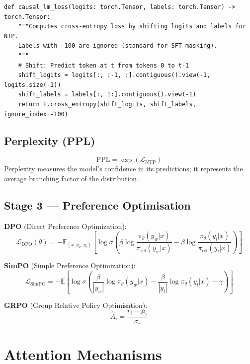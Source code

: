 \begin{lstlisting}[style=pythonstyle, caption={Causal LM loss with token masking}, label=lst:ntp_loss]
def causal_lm_loss(logits: torch.Tensor, labels: torch.Tensor) -> torch.Tensor:
    """Computes cross-entropy loss by shifting logits and labels for NTP.
    Labels with -100 are ignored (standard for SFT masking).
    """
    # Shift: Predict token at t from tokens 0 to t-1
    shift_logits = logits[:, :-1, :].contiguous().view(-1, logits.size(-1))
    shift_labels = labels[:, 1:].contiguous().view(-1)
    return F.cross_entropy(shift_logits, shift_labels, ignore_index=-100)
\end{lstlisting}

\subsection{Perplexity (PPL)}
\label{form:ppl}

\[
  \mathrm{PPL} = \exp(\mathcal{L}_\mathrm{NTP})
\]
Perplexity measures the model's confidence in its predictions; it represents the average branching factor of the distribution.

\subsection{Stage 3 --- Preference Optimisation}

\noindent\textbf{DPO} (Direct Preference Optimization):
\[
  \mathcal{L}_\mathrm{DPO}(\theta) = -\mathbb{E}_{(x,y_w,y_l)}\!\left[ \log\sigma\!\left( \beta\log\frac{\pi_\theta(y_w|x)}{\pi_\mathrm{ref}(y_w|x)} - \beta\log\frac{\pi_\theta(y_l|x)}{\pi_\mathrm{ref}(y_l|x)} \right) \right]
\]

\noindent\textbf{SimPO} (Simple Preference Optimization):
\[
  \mathcal{L}_\mathrm{SimPO} = -\mathbb{E}\!\left[\log\sigma\!\left( \frac{\beta}{|y_w|}{\log\pi_\theta(y_w|x)} - \frac{\beta}{|y_l|}{\log\pi_\theta(y_l|x)} - \gamma \right)\right]
\]

\noindent\textbf{GRPO} (Group Relative Policy Optimisation):
\[
  \hat{A}_i = \frac{r_i - \mu_r}{\sigma_r}
\]

\section{Attention Mechanisms}
\label{app:attention}


